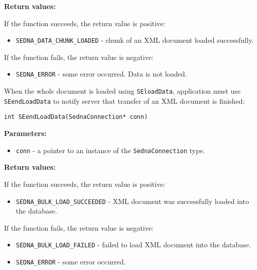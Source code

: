 \documentclass[a4paper,12pt]{article}
\newenvironment{citemize}
{\begin{itemize}
  \setlength{\itemsep}{0pt}
  \setlength{\parskip}{0pt}
  \setlength{\parsep}{0pt}}
{\end{itemize}}
\begin{document}
\noindent
\textbf{Return values:}

\medskip

\noindent
If the function succeeds, the return value is positive:

\begin{citemize}
\item\verb!SEDNA_DATA_CHUNK_LOADED! - chunk of an XML document loaded
successfully.
\end{citemize}

\noindent
If the function fails, the return value is negative:

\begin{citemize}
\item\verb!SEDNA_ERROR! - some error occurred. Data is not loaded.
\end{citemize}

When the whole document is loaded using \verb!SEloadData!, application must use
\verb!SEendLoadData! to notify server that transfer of an XML document is
finished:

\begin{verbatim}
int SEendLoadData(SednaConnection* conn)
\end{verbatim}

\noindent
\textbf{Parameters:}

\begin{citemize}
\item\verb!conn! - a pointer to an instance of the \verb!SednaConnection! type.
\end{citemize}

\noindent
\textbf{Return values:}

\medskip

\noindent
If the function succeeds, the return value is positive:

\begin{citemize}
\item\verb!SEDNA_BULK_LOAD_SUCCEEDED! - XML document was successfully loaded
into the database.
\end{citemize}

\noindent
If the function fails, the return value is negative:

\begin{citemize}
\item\verb!SEDNA_BULK_LOAD_FAILED! - failed to load XML document into the
database.
\item\verb!SEDNA_ERROR! - some error occurred.
\end{citemize}
\end{document}
